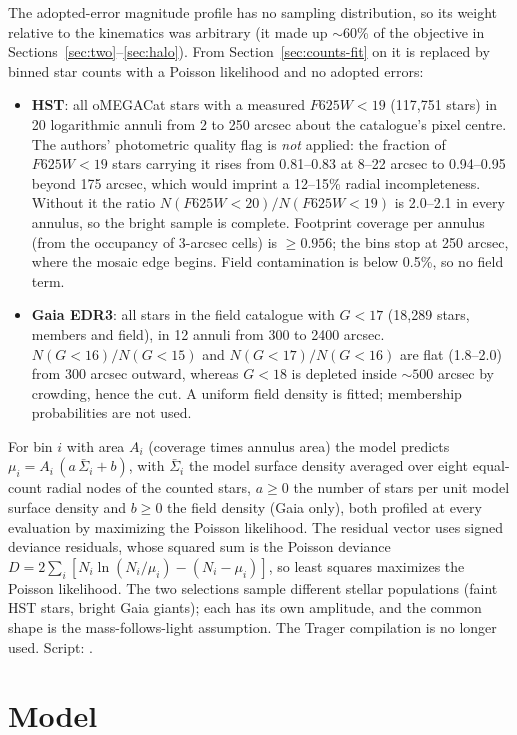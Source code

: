 \documentclass[11pt,a4paper]{article}
\begin{document}
The adopted-error magnitude profile has no sampling distribution, so its
weight relative to the kinematics was arbitrary (it made up $\sim60$\% of the
objective in Sections~\ref{sec:two}--\ref{sec:halo}). From
Section~\ref{sec:counts-fit} on it is replaced by binned star counts with a
Poisson likelihood and no adopted errors:
\begin{itemize}
\item \textbf{HST}: all oMEGACat stars with a measured $F625W<19$
  (117{,}751 stars) in 20 logarithmic annuli from 2 to 250 arcsec about the
  catalogue's pixel centre. The authors' photometric quality flag is
  \emph{not} applied: the fraction of $F625W<19$ stars carrying it rises from
  0.81--0.83 at 8--22 arcsec to 0.94--0.95 beyond 175 arcsec, which would
  imprint a 12--15\% radial incompleteness. Without it the ratio
  $N(F625W<20)/N(F625W<19)$ is 2.0--2.1 in every annulus, so the bright
  sample is complete. Footprint coverage per annulus (from the occupancy of
  3-arcsec cells) is $\ge0.956$; the bins stop at 250 arcsec, where the
  mosaic edge begins. Field contamination is below 0.5\%, so no field term.
\item \textbf{Gaia EDR3}: all stars in the \citet{2021MNRAS.505.5978V} field
  catalogue with $G<17$ (18{,}289 stars, members and field), in 12 annuli
  from 300 to 2400 arcsec. $N(G<16)/N(G<15)$ and $N(G<17)/N(G<16)$ are flat
  (1.8--2.0) from 300 arcsec outward, whereas $G<18$ is depleted inside
  $\sim500$ arcsec by crowding, hence the cut. A uniform field density is
  fitted; membership probabilities are not used.
\end{itemize}
For bin $i$ with area $A_i$ (coverage times annulus area) the model
predicts $\mu_i=A_i\,(a\,\bar\Sigma_i+b)$, with $\bar\Sigma_i$ the model
surface density averaged over eight equal-count radial nodes of the counted
stars, $a\ge0$ the number of stars per unit model surface density and
$b\ge0$ the field density (Gaia only), both profiled at every evaluation by
maximizing the Poisson likelihood. The residual vector uses signed deviance
residuals, whose squared sum is the Poisson deviance
$D=2\sum_i[N_i\ln(N_i/\mu_i)-(N_i-\mu_i)]$, so least squares maximizes the
Poisson likelihood. The two selections sample different stellar populations
(faint HST stars, bright Gaia giants); each has its own amplitude, and the
common shape is the mass-follows-light assumption. The Trager compilation is
no longer used. Script: .

\section{Model}
\label{sec:model}
\end{document}
